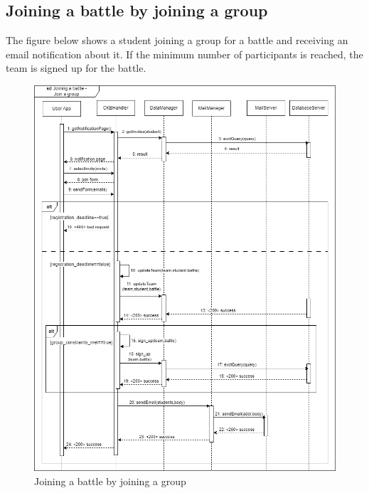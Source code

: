 \subsection{Joining a battle by joining a group}
The figure below shows a student joining a group for a battle and receiving an email notification about it. If the 
minimum number of participants is reached, the team is signed up for the battle.\\
\begin{figure}[H]
    \centering
    \includegraphics[width=1\textwidth]{images/seq_diagrams/joining_battle_join_group_DD.png}
    \caption{Joining a battle by joining a group}
\end{figure}

